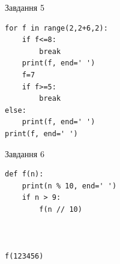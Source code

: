 \documentclass[12pt, ukrainian]{article}
\begin{document}
{\vspace{15mm}
\begin{minipage}[t]{9.7cm}                
{\begin{center}Завдання {5}\end{center}}
\begin{verbatim}
for f in range(2,2+6,2):
    if f<=8:
        break
    print(f, end=' ')
    f=7
    if f>=5:
        break
else:
    print(f, end=' ')
print(f, end=' ')
\end{verbatim}     
\end{minipage}
\vline \hspace{8mm}
\begin{minipage}[t]{8.0cm}                
{\begin{center}Завдання {6}\end{center}}
\begin{verbatim}
def f(n):
    print(n % 10, end=' ')
    if n > 9:
        f(n // 10)
    


f(123456)
\end{verbatim}     
\end{minipage}

}
\newpage
\end{document}
